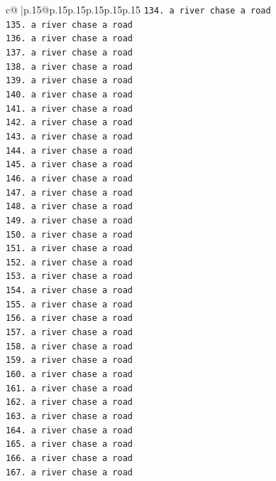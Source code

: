 \documentclass{article}
\begin{document}
{\begin{supertabular}{c@{$\;$}|p{.15\linewidth}@{}p{.15\linewidth}p{.15\linewidth}p{.15\linewidth}p{.15\linewidth}p{.15\linewidth}}
{{{\texttt{134. a river chase a road} \\
\texttt{135. a river chase a road} \\
\texttt{136. a river chase a road} \\
\texttt{137. a river chase a road} \\
\texttt{138. a river chase a road} \\
\texttt{139. a river chase a road} \\
\texttt{140. a river chase a road} \\
\texttt{141. a river chase a road} \\
\texttt{142. a river chase a road} \\
\texttt{143. a river chase a road} \\
\texttt{144. a river chase a road} \\
\texttt{145. a river chase a road} \\
\texttt{146. a river chase a road} \\
\texttt{147. a river chase a road} \\
\texttt{148. a river chase a road} \\
\texttt{149. a river chase a road} \\
\texttt{150. a river chase a road} \\
\texttt{151. a river chase a road} \\
\texttt{152. a river chase a road} \\
\texttt{153. a river chase a road} \\
\texttt{154. a river chase a road} \\
\texttt{155. a river chase a road} \\
\texttt{156. a river chase a road} \\
\texttt{157. a river chase a road} \\
\texttt{158. a river chase a road} \\
\texttt{159. a river chase a road} \\
\texttt{160. a river chase a road} \\
\texttt{161. a river chase a road} \\
\texttt{162. a river chase a road} \\
\texttt{163. a river chase a road} \\
\texttt{164. a river chase a road} \\
\texttt{165. a river chase a road} \\
\texttt{166. a river chase a road} \\
\texttt{167. a river chase a road} \\
}}}
\end{supertabular}}
\end{document}
